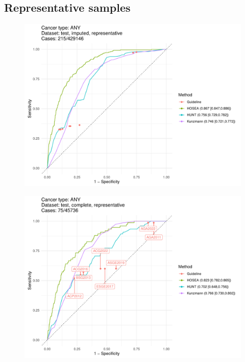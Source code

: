 \documentclass[12pt]{article}
\begin{document}
\newpage
\clearpage
\subsection{Representative samples}


\begin{figure}[ht]
\includegraphics[width=1.0\linewidth]{comparison/ANY_imputed_representative.pdf}
\end{figure}
\begin{figure}[ht]
\includegraphics[width=1.0\linewidth]{comparison/ANY_complete_representative.pdf}
\end{figure}
\end{document}
